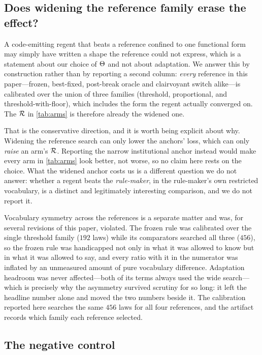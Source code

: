 \documentclass[11pt]{article}
\begin{document}



\subsection{Does widening the reference family erase the effect?}
\label{sec:wide-oracle}

A code-emitting regent that beats a reference confined to one functional form may simply have
written a shape the reference could not express, which is a statement about our choice of
$\Theta$ and not about adaptation. We answer this by construction rather than by reporting a
second column: \emph{every} reference in this paper---frozen, best-fixed, post-break oracle and
clairvoyant switch alike---is calibrated over the union of three families (threshold, proportional,
and threshold-with-floor), which includes the form the regent actually converged on. The $\mathcal{R}$
in \cref{tab:arms} is therefore already the widened one.

That is the conservative direction, and it is worth being explicit about why. Widening the reference
search can only lower the anchors' loss, which can only \emph{raise} an arm's $\mathcal{R}$. Reporting the
narrow institutional anchor instead would make every arm in \cref{tab:arms} look better, not worse,
so no claim here rests on the choice. What the widened anchor costs us is a different question we do
not answer: whether a regent beats the \emph{rule-maker}, in the rule-maker's own restricted
vocabulary, is a distinct and legitimately interesting comparison, and we do not report it.

Vocabulary symmetry across the references is a separate matter and was, for several revisions of this
paper, violated. The frozen rule was calibrated over the single threshold family ($192$ laws) while
its comparators searched all three ($456$), so the frozen rule was handicapped not only in what it
was allowed to know but in what it was allowed to say, and every ratio with it in the numerator was
inflated by an unmeasured amount of pure vocabulary difference. Adaptation headroom was never
affected---both of its terms always used the wide search---which is precisely why the asymmetry
survived scrutiny for so long: it left the headline number alone and moved the two numbers beside it.
The calibration reported here searches the same $456$ laws for all four references, and the artifact
records which family each reference selected.

\subsection{The negative control}
\end{document}
